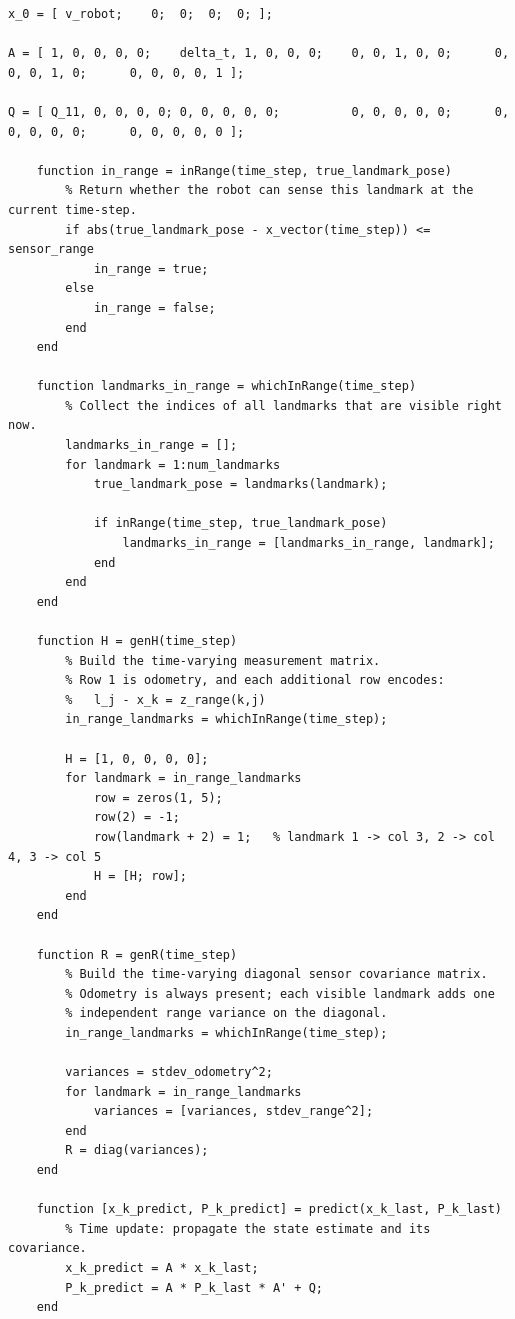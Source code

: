 \documentclass[11pt]{article}
\begin{document}
\begin{lstlisting}[caption={sim4.m}, label={lst:sim4}]
x_0 = [ v_robot;    0;  0;  0;  0; ];

A = [ 1, 0, 0, 0, 0;    delta_t, 1, 0, 0, 0;    0, 0, 1, 0, 0;      0, 0, 0, 1, 0;      0, 0, 0, 0, 1 ];

Q = [ Q_11, 0, 0, 0, 0; 0, 0, 0, 0, 0;          0, 0, 0, 0, 0;      0, 0, 0, 0, 0;      0, 0, 0, 0, 0 ];

    function in_range = inRange(time_step, true_landmark_pose)
        % Return whether the robot can sense this landmark at the current time-step.
        if abs(true_landmark_pose - x_vector(time_step)) <= sensor_range
            in_range = true;
        else
            in_range = false;
        end
    end

    function landmarks_in_range = whichInRange(time_step)
        % Collect the indices of all landmarks that are visible right now.
        landmarks_in_range = [];
        for landmark = 1:num_landmarks
            true_landmark_pose = landmarks(landmark);
  
            if inRange(time_step, true_landmark_pose)
                landmarks_in_range = [landmarks_in_range, landmark];
            end       
        end
    end

    function H = genH(time_step)
        % Build the time-varying measurement matrix.
        % Row 1 is odometry, and each additional row encodes:
        %   l_j - x_k = z_range(k,j)
        in_range_landmarks = whichInRange(time_step);

        H = [1, 0, 0, 0, 0];
        for landmark = in_range_landmarks
            row = zeros(1, 5);
            row(2) = -1;
            row(landmark + 2) = 1;   % landmark 1 -> col 3, 2 -> col 4, 3 -> col 5
            H = [H; row];
        end
    end

    function R = genR(time_step)
        % Build the time-varying diagonal sensor covariance matrix.
        % Odometry is always present; each visible landmark adds one
        % independent range variance on the diagonal.
        in_range_landmarks = whichInRange(time_step);
        
        variances = stdev_odometry^2;
        for landmark = in_range_landmarks
            variances = [variances, stdev_range^2];
        end
        R = diag(variances);
    end

    function [x_k_predict, P_k_predict] = predict(x_k_last, P_k_last)
        % Time update: propagate the state estimate and its covariance.
        x_k_predict = A * x_k_last;
        P_k_predict = A * P_k_last * A' + Q;
    end


\end{lstlisting}
\end{document}
